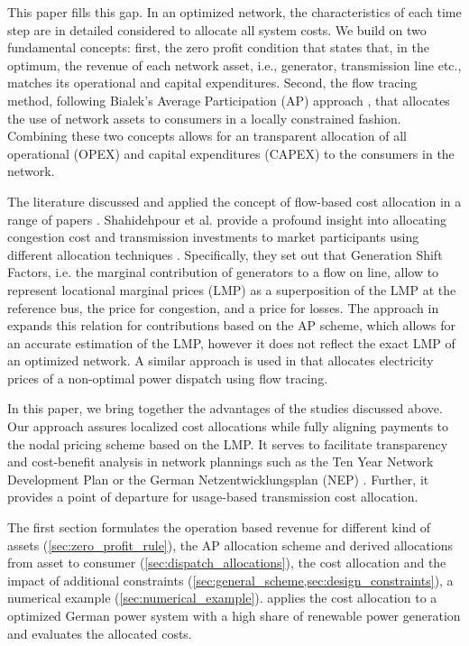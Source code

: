\documentclass[11pt,twocolumn]{article}
\begin{document}
This paper fills this gap. In an optimized network, the characteristics of each time step are in detailed considered to allocate all system costs. We build on two fundamental concepts: first, the zero profit condition that states that, in the optimum, the revenue of each network asset, i.e., generator, transmission line etc., matches its operational and capital expenditures. Second, the flow tracing method, following Bialek’s Average Participation (AP) approach \cite{bialek_tracing_1996}, that allocates the use of network assets to consumers in a locally constrained fashion. 
Combining these two concepts allows for an transparent allocation of all operational (OPEX) and capital expenditures (CAPEX) to the consumers in the network. 
 
The literature discussed and applied the concept of flow-based cost allocation in a range of papers \cite{galiana_transmission_2003,shahidehpour_market_2002,meng_investigation_2007,schafer_allocation_2017,nikoukar_transmission_2012,arabali_pricing_2012,wu_locational_2005}. Shahidehpour et al. provide a profound insight into allocating congestion cost and transmission investments to market participants using different allocation techniques \cite{shahidehpour_market_2002}. Specifically, they set out that Generation Shift Factors, i.e. the marginal contribution of generators to a flow on line, allow to represent locational marginal prices (LMP) as a superposition of the LMP at the reference bus, the price for congestion, and a price for losses. The approach in \cite{meng_investigation_2007} expands this relation for contributions based on the AP scheme, which allows for an accurate estimation of the LMP, however it does not reflect the exact LMP of an optimized network. A similar approach is used in \cite{schafer_allocation_2017} that allocates electricity prices of a non-optimal power dispatch using flow tracing.


In this paper, we bring together the advantages of the studies discussed above. Our approach assures localized cost allocations while fully aligning payments to the nodal pricing scheme based on the LMP. It serves to facilitate transparency and cost-benefit analysis in network plannings such as the Ten Year Network Development Plan \cite{entso-e_completing_2020} or the German Netzentwicklungsplan (NEP) \cite{bundesnetzagentur_netzentwicklungsplan_2020}. Further, it provides a point of departure for usage-based transmission cost allocation.

The first section formulates the operation based revenue for different kind of assets (\cref{sec:zero_profit_rule}),  the AP allocation scheme and derived allocations from asset to consumer (\cref{sec:dispatch_allocations}), the cost allocation and the impact of additional constraints (\cref{sec:general_scheme,sec:design_constraints}), a numerical example (\cref{sec:numerical_example}).  applies the cost allocation to a optimized German power system with a high share of renewable power generation and evaluates the allocated costs.  
\end{document}

